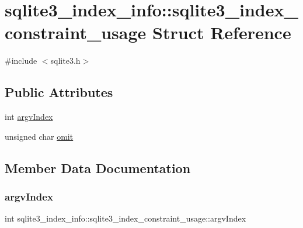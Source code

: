 \hypertarget{structsqlite3__index__info_1_1sqlite3__index__constraint__usage}{}\section{sqlite3\+\_\+index\+\_\+info\+::sqlite3\+\_\+index\+\_\+constraint\+\_\+usage Struct Reference}
\label{structsqlite3__index__info_1_1sqlite3__index__constraint__usage}


{\ttfamily \#include $<$sqlite3.\+h$>$}

\subsection*{Public Attributes}
\begin{DoxyCompactItemize}
\item 
int \mbox{\hyperlink{structsqlite3__index__info_1_1sqlite3__index__constraint__usage_a2cbf680033c2937b3de226e091743a94}{argv\+Index}}
\item 
unsigned char \mbox{\hyperlink{structsqlite3__index__info_1_1sqlite3__index__constraint__usage_ad07fa17d30e4fb3abe23ceaf84edf0ef}{omit}}
\end{DoxyCompactItemize}


\subsection{Member Data Documentation}
\mbox{\label{structsqlite3__index__info_1_1sqlite3__index__constraint__usage_a2cbf680033c2937b3de226e091743a94}} 
\subsubsection{\texorpdfstring{argvIndex}{argvIndex}}
{\footnotesize\ttfamily int sqlite3\+\_\+index\+\_\+info\+::sqlite3\+\_\+index\+\_\+constraint\+\_\+usage\+::argv\+Index}

\mbox{\label{structsqlite3__index__info_1_1sqlite3__index__constraint__usage_ad07fa17d30e4fb3abe23ceaf84edf0ef}} 
